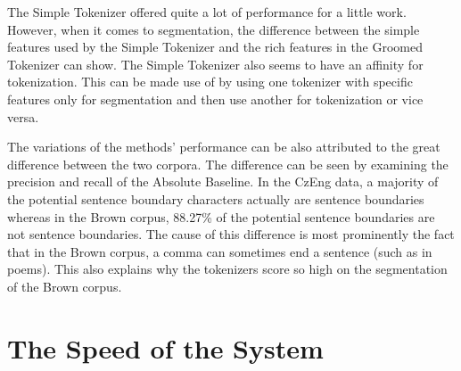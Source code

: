 The Simple Tokenizer offered quite a lot of performance for a little work.
However, when it comes to segmentation, the difference between the simple
features used by the Simple Tokenizer and the rich features in the Groomed
Tokenizer can show. The Simple Tokenizer also seems to have an affinity for
tokenization. This can be made use of by using one tokenizer with specific
features only for segmentation and then use another for tokenization or vice
versa.

The variations of the methods' performance can be also attributed to the great
difference between the two corpora. The difference can be seen by examining the
precision and recall of the Absolute Baseline. In the CzEng data, a majority of
the potential sentence boundary characters actually are sentence boundaries
whereas in the Brown corpus, 88.27\% of the potential sentence boundaries are
not sentence boundaries. The cause of this difference is most prominently the
fact that in the Brown corpus, a comma can sometimes end a sentence (such as in
poems). This also explains why the tokenizers score so high on the segmentation
of the Brown corpus.

\section{The Speed of the System}
\label{sec:eval-spd}
